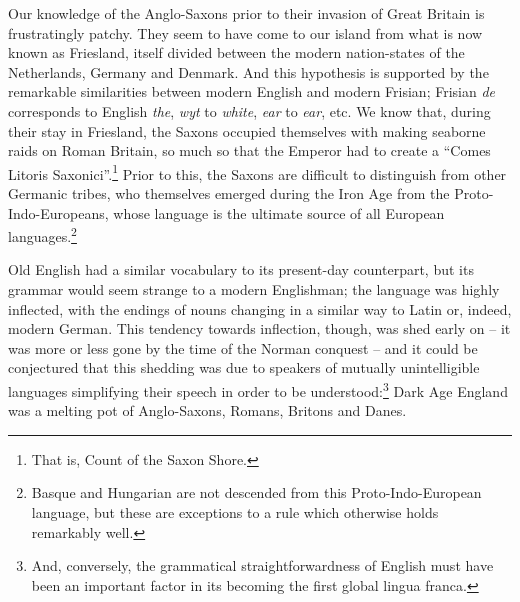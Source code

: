 \documentclass[0main.tex]{subfiles}
\begin{document}
Our knowledge of the Anglo-Saxons prior to their invasion of Great Britain is frustratingly patchy. They seem to have come to our island from what is now known as Friesland, itself divided between the modern nation-states of the Netherlands, Germany and Denmark. And this hypothesis is supported by the remarkable similarities between modern English and modern Frisian; Frisian \emph{de} corresponds to English \emph{the}, \emph{wyt} to \emph{white}, \emph{ear} to \emph{ear}, etc. We know that, during their stay in Friesland, the Saxons occupied themselves with making seaborne raids on Roman Britain, so much so that the Emperor had to create a ``Comes Litoris Saxonici''.\footnote{That is, Count of the Saxon Shore.} Prior to this, the Saxons are difficult to distinguish from other Germanic tribes, who themselves emerged during the Iron Age from the Proto-Indo-Europeans, whose language is the ultimate source of all European languages.\footnote{Basque and Hungarian are not descended from this Proto-Indo-European language, but these are exceptions to a rule which otherwise holds remarkably well.}

Old English had a similar vocabulary to its present-day counterpart, but its grammar would seem strange to a modern Englishman; the language was highly inflected, with the endings of nouns changing in a similar way to Latin or, indeed, modern German. This tendency towards inflection, though, was shed early on -- it was more or less gone by the time of the Norman conquest -- and it could be conjectured that this shedding was due to speakers of mutually unintelligible languages simplifying their speech in order to be understood:\footnote{And, conversely, the grammatical straightforwardness of English must have been an important factor in its becoming the first global lingua franca.} Dark Age England was a melting pot of Anglo-Saxons, Romans, Britons and Danes.
\end{document}
